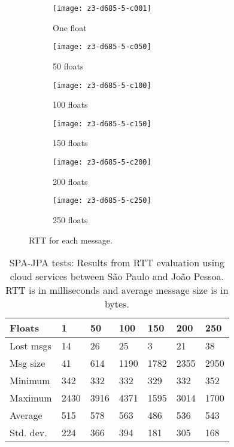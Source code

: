 \begin{figure*}[!ht]
\centering
\begin{subfigure}{.30\textwidth}
	\texttt{[image: z3-d685-5-c001]}
    \caption{One float}
	\label{fig:z3-d685-c001}
\end{subfigure}
\begin{subfigure}{.30\textwidth}
	\texttt{[image: z3-d685-5-c050]}
	\caption{50 floats}
	\label{fig:z3-d685-c050}
\end{subfigure}
\begin{subfigure}{.30\textwidth}
	\texttt{[image: z3-d685-5-c100]}
	\caption{100 floats}
	\label{fig:z3-d685-c100}
\end{subfigure}
\par\bigskip
\begin{subfigure}{.30\textwidth}
	\texttt{[image: z3-d685-5-c150]}
	\caption{150 floats}
	\label{fig:z3-d685-4-c150}
\end{subfigure}
\begin{subfigure}{.30\textwidth}
	\texttt{[image: z3-d685-5-c200]}
	\caption{200 floats}
	\label{fig:z3-d685-c200}
\end{subfigure}
\begin{subfigure}{.30\textwidth}
	\texttt{[image: z3-d685-5-c250]}
	\caption{250 floats}
	\label{fig:z3-d685-c250}
\end{subfigure} 

\caption{RTT for each message.}
\label{fig:z3-d685-evaluation}
\end{figure*}


\begin{table}[!ht]
\begin{center}
\begin{tabular}{|l|llllll|}
\hline 
Floats    & 1     & 50    & 100    & 150   & 200    & 250   \\
\hline
Lost msgs & 14    & 26    & 25     & 3     & 21     & 38    \\
Msg size  & 41    &	614   &	1190   & 1782  & 2355   & 2950  \\
Minimum   & 342   & 332   & 332    & 329   & 332    & 352   \\
Maximum   & 2430  & 3916  & 4371   & 1595  & 3014   & 1700  \\
Average   & 515   & 578   & 563    & 486   & 536    & 543   \\
Std. dev. & 224   & 366   & 394    & 181   & 305    & 168   \\
\hline
\end{tabular}
\end{center}

 \caption{SPA-JPA tests: Results from RTT evaluation using cloud services between S\~{a}o Paulo and Jo\~{a}o Pessoa. RTT is in milliseconds and average message size is in bytes.}
 \label{tab:sao-jpa}
\end{table}

